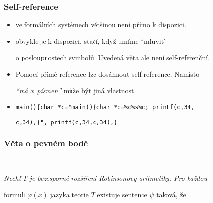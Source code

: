 \subsubsection*{Self-reference}
    
    \begin{itemize}
    \item {}
    \medskip
    
     ve formálních systémech většinou není přímo k dispozici.
    \medskip
    
    \item {}
    \medskip
    
     obvykle je k dispozici, stačí, když umíme ``mluvit''
    \smallskip
    
    o posloupnostech symbolů. Uvedená věta ale není self-referenční.
    \medskip
    
    \item {}
    \smallskip
    
    \smallskip
    
    \medskip
    
    Pomocí přímé reference lze dosáhnout self-reference. Namísto
    \smallskip
    
    \emph{``má $x$ písmen''} může být jiná vlastnost.
    \medskip
    
    \item \texttt{main()\{char *c="main()\{char *c=\%c\%s\%c; printf(c,34,}
    \smallskip
    
    \texttt{c,34);\}"; printf(c,34,c,34);\}}
    \end{itemize}
    
    
    
    
    \subsubsection*{Věta o pevném bodě}
    
    {\bf {}}\ \ {\it Nechť $T$ je bezesporné rozšíření Robinsonovy aritmetiky. Pro každou
    \smallskip
    
    formuli $\varphi(x)$ jazyka teorie $T$ existuje sentence $\psi$ taková, že .}
    \medskip
    
